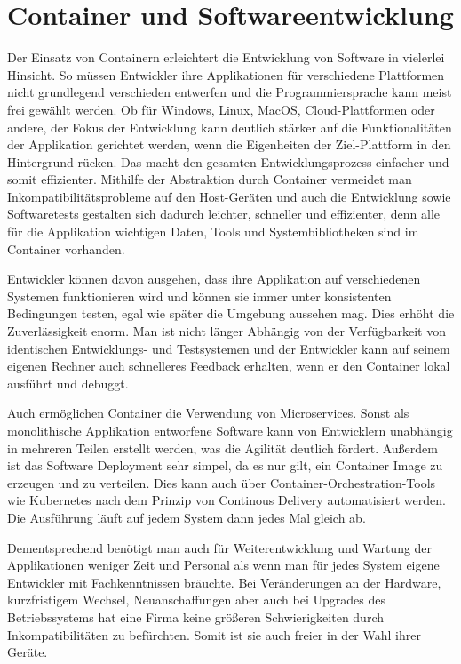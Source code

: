 \section{Container und Softwareentwicklung} 
\label{sec:Softwareentwicklung}

Der Einsatz von Containern erleichtert die Entwicklung von Software in vielerlei Hinsicht. So müssen Entwickler ihre Applikationen für verschiedene Plattformen nicht grundlegend verschieden entwerfen und die Programmiersprache kann meist frei gewählt werden. 
Ob für Windows, Linux, MacOS, Cloud-Plattformen oder andere, der Fokus der Entwicklung kann deutlich stärker auf die Funktionalitäten der Applikation gerichtet werden, wenn die Eigenheiten der Ziel-Plattform in den Hintergrund rücken. Das macht den gesamten Entwicklungsprozess einfacher und somit effizienter.
Mithilfe der Abstraktion durch Container vermeidet man Inkompatibilitätsprobleme auf den Host-Geräten und auch die Entwicklung sowie Softwaretests gestalten sich dadurch leichter, schneller und effizienter, denn alle für die Applikation wichtigen Daten, Tools und Systembibliotheken sind im Container vorhanden.
\cite{11517836120160501}

Entwickler können davon ausgehen, dass ihre Applikation auf verschiedenen Systemen funktionieren wird und können sie immer unter konsistenten Bedingungen testen, egal wie später die Umgebung aussehen mag. Dies erhöht die Zuverlässigkeit enorm. Man ist nicht länger Abhängig von der Verfügbarkeit von identischen Entwicklungs- und Testsystemen und der Entwickler kann auf seinem eigenen Rechner auch schnelleres Feedback erhalten, wenn er den Container lokal ausführt und debuggt.

Auch ermöglichen Container die Verwendung von Microservices. Sonst als monolithische Applikation entworfene Software kann von Entwicklern unabhängig in mehreren Teilen erstellt werden, was die Agilität deutlich fördert.
Außerdem ist das Software Deployment sehr simpel, da es nur gilt, ein Container Image zu erzeugen und zu verteilen. Dies kann auch über Container-Orchestration-Tools wie Kubernetes nach dem Prinzip von Continous Delivery automatisiert werden. Die Ausführung läuft auf jedem System dann jedes Mal gleich ab.

Dementsprechend benötigt man auch für Weiterentwicklung und Wartung der Applikationen weniger Zeit und Personal als wenn man für jedes System eigene Entwickler mit Fachkenntnissen bräuchte.
Bei Veränderungen an der Hardware, kurzfristigem Wechsel, Neuanschaffungen aber auch bei Upgrades des Betriebssystems hat eine Firma keine größeren Schwierigkeiten durch Inkompatibilitäten zu befürchten. Somit ist sie auch freier in der Wahl ihrer Geräte.

